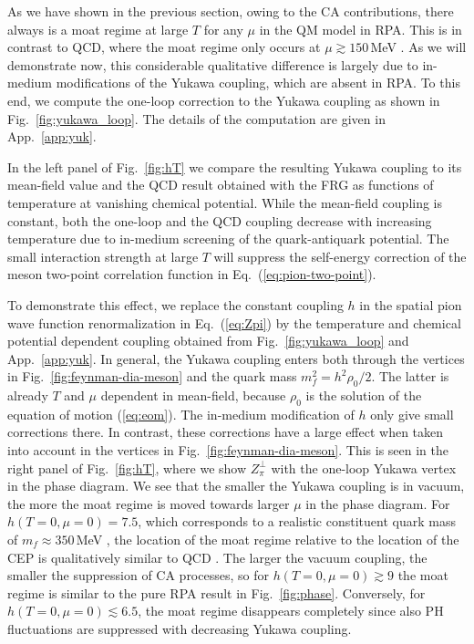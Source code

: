 \documentclass[reprint,english,superscriptaddress,preprintnumbers,amsmath,amssymb,aps,prd]{revtex4-2}
\def\eq#1{(\ref{#1})}
\def\Eq#1{Eq.~(\ref{#1})}
\def\Fig#1{Fig.~\ref{#1}}
\def\App#1{App.~\ref{#1}}
\begin{document}
As we have shown in the previous section, owing to the CA contributions, there always is a moat regime at large $T$ for any $\mu$ in the QM model in RPA. This is in contrast to QCD, where the moat regime only occurs at $\mu \gtrsim 150$\,MeV \cite{Fu:2019hdw,Fu:2024rto}. As we will demonstrate now, this considerable qualitative difference is largely due to in-medium modifications of the Yukawa coupling, which are absent in RPA. To this end, we compute the one-loop correction to the Yukawa coupling as shown in \Fig{fig:yukawa_loop}. The details of the computation are given in \App{app:yuk}. 



In the left panel of \Fig{fig:hT} we compare the resulting Yukawa coupling to its mean-field value and the QCD result obtained with the FRG \cite{Fu:2019hdw} as functions of temperature at vanishing chemical potential. While the mean-field coupling is constant, both the one-loop and the QCD coupling decrease with increasing temperature due to in-medium screening of the quark-antiquark potential.
The small interaction strength at large $T$ will suppress the self-energy correction of the meson two-point correlation function in \Eq{eq:pion-two-point}.

To demonstrate this effect, we replace the constant coupling $h$ in the spatial pion wave function renormalization in \Eq{eq:Zpi} by the temperature and chemical potential dependent coupling obtained from \Fig{fig:yukawa_loop} and \App{app:yuk}. In general, the Yukawa coupling enters both through the vertices in \Fig{fig:feynman-dia-meson} and the quark mass $m_f^2 = h^2 \rho_0/2$. The latter is already $T$ and $\mu$ dependent in mean-field, because $\rho_0$ is the solution of the equation of motion \eq{eq:eom}. The in-medium modification of $h$ only give small corrections there. In contrast, these corrections have a large effect when taken into account in the vertices in \Fig{fig:feynman-dia-meson}. This is seen in the right panel of \Fig{fig:hT}, where we show $Z_\pi^\perp$ with the one-loop Yukawa vertex in the phase diagram. We see that the smaller the Yukawa coupling is in vacuum, the more the moat regime is moved towards larger $\mu$ in the phase diagram. For $h(T=0,\mu=0) = 7.5$, which corresponds to a realistic constituent quark mass of $m_f \approx 350$\,MeV \cite{Cyrol:2017ewj}, the location of the moat regime relative to the location of the CEP is qualitatively similar to QCD \cite{Fu:2019hdw,Fu:2024rto}. The larger the vacuum coupling, the smaller the suppression of CA processes, so for $h(T=0,\mu=0) \gtrsim 9$ the moat regime is similar to the pure RPA result in \Fig{fig:phase}. Conversely, for $h(T=0,\mu=0) \lesssim 6.5$, the moat regime disappears completely since also PH fluctuations are suppressed with decreasing Yukawa coupling.
\end{document}
